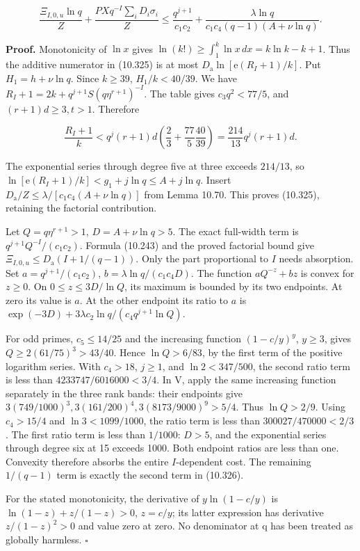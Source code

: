 \documentclass[
  11pt,
  a4paper,
]{article}
\begin{document}
\[
\frac{\Xi_{I,0,u}\ln q}Z
+\frac{PXq^{-I}\sum_iD_i\sigma_i}Z
\le\frac{q^{j+1}}{c_1c_2}
+\frac{\lambda\ln q}{c_1c_4(q-1)(A+\nu\ln q)}.
\tag{10.326}
\]

\textbf{Proof.} Monotonicity of \(\ln x\) gives
\(\ln(k!)\ge\int_1^k\ln x\,dx=k\ln k-k+1\). Thus the additive numerator
in (10.325) is at most \(D_{\mathrm a}\ln[\mathrm e(R_I+1)/k]\). Put
\(H_1=h+\nu\ln q\). Since \(k\ge39\), \(H_1/k<40/39\). We have
\(R_I+1=2k+q^{j+1}S(q\eta^{r+1})^{-I}\). The table gives
\(c_3q^2<77/5\), and \((r+1)d\ge3,t>1\). Therefore

\[
\frac{R_I+1}{k}
<q^j(r+1)d\left(\frac23+\frac{77}5\frac{40}{39}\right)
=\frac{214}{13}q^j(r+1)d.
\]

The exponential series through degree five at three exceeds \(214/13\),
so \(\ln[\mathrm e(R_I+1)/k]<g_1+j\ln q\le A+j\ln q\). Insert
\(D_{\mathrm a}/Z\le\lambda/[c_1c_4(A+\nu\ln q)]\) from Lemma 10.70.
This proves (10.325), retaining the factorial contribution.

Let \(Q=q\eta^{r+1}>1\), \(D=A+\nu\ln q>5\). The exact full-width term
is \(q^{j+1}Q^{-I}/(c_1c_2)\). Formula (10.243) and the proved factorial
bound give \(\Xi_{I,0,u}\le D_{\mathrm a}(I+1/(q-1))\). Only the part
proportional to \(I\) needs absorption. Set \(a=q^{j+1}/(c_1c_2)\),
\(b=\lambda\ln q/(c_1c_4D)\). The function \(aQ^{-z}+bz\) is convex for
\(z\ge0\). On \(0\le z\le3D/\ln Q\), its maximum is bounded by its two
endpoints. At zero its value is \(a\). At the other endpoint its ratio
to \(a\) is \(\exp(-3D)+3\lambda c_2\ln q/(c_4q^{j+1}\ln Q)\).

For odd primes, \(c_5\le14/25\) and the increasing function
\((1-c/y)^y\), \(y\ge3\), gives \(Q\ge2(61/75)^3>43/40\). Hence
\(\ln Q>6/83\), by the first term of the positive logarithm series. With
\(c_4>18\), \(j\ge1\), and \(\ln2<347/500\), the second ratio term is
less than \(4233747/6016000<3/4\). In V, apply the same increasing
function separately in the three rank bands: their endpoints give
\(3(749/1000)^3,3(161/200)^4,3(8173/9000)^9>5/4\). Thus \(\ln Q>2/9\).
Using \(c_4>15/4\) and \(\ln3<1099/1000\), the ratio term is less than
\(300027/470000<2/3\). The first ratio term is less than \(1/1000\):
\(D>5\), and the exponential series through degree six at 15 exceeds
1000. Both endpoint ratios are less than one. Convexity therefore
absorbs the entire \(I\)-dependent cost. The remaining \(1/(q-1)\) term
is exactly the second term in (10.326).

For the stated monotonicity, the derivative of \(y\ln(1-c/y)\) is
\(\ln(1-z)+z/(1-z)>0\), \(z=c/y\); its latter expression has derivative
\(z/(1-z)^2>0\) and value zero at zero. No denominator at q has been
treated as globally harmless. \(\square\)
\end{document}
